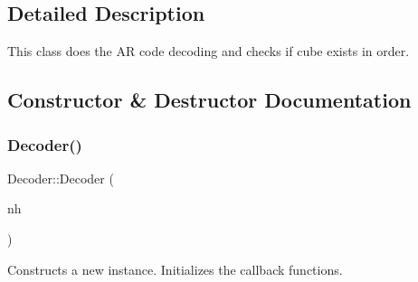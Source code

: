 \subsection{Detailed Description}
This class does the AR code decoding and checks if cube exists in order. 

\subsection{Constructor \& Destructor Documentation}
\mbox{\label{class_decoder_a4ffe94fb988df3f66811de2c38c81d09}} 
\subsubsection{\texorpdfstring{Decoder()}{Decoder()}}
{\footnotesize\ttfamily Decoder\+::\+Decoder (\begin{DoxyParamCaption}\item[{ros\+::\+Node\+Handle \&}]{nh }\end{DoxyParamCaption})\hspace{0.3cm}{\ttfamily [explicit]}}



Constructs a new instance. Initializes the callback functions. 

